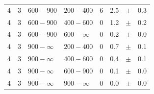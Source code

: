 \begin{table}[!h]
\begin{tabular}{rrllrrcl}
		4\T & 3 & $ 600- 900$ & $200-400$ &      6 &      2.5 &$\pm$&    0.3 \\
		4 & 3 & $ 600- 900$ & $400-600$ &      0 &      1.2 &$\pm$&    0.2 \\
		4 & 3 & $ 600- 900$ & $600-\infty$ &      0 &      0.2 &$\pm$&    0.0 \\
		4\T & 3 & $ 900- \infty$ & $200-400$ &      0 &      0.7 &$\pm$&    0.1 
		\\
		4 & 3 & $ 900- \infty$ & $400-600$ &      0 &      0.4 &$\pm$&    0.1 \\
		4 & 3 & $ 900- \infty$ & $600-900$ &      0 &      0.1 &$\pm$&    0.0 \\
		4 & 3 & $ 900- \infty$ & $900-\infty$ &      0 &      0.0 &$\pm$&    
		0.0 \\
		\hline
	\end{tabular}
\end{table}

